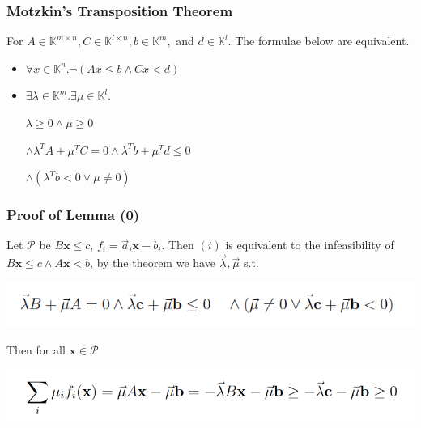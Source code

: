 \documentclass[11pt]{beamer}
\begin{document}
\begin{frame}\frametitle{Motzkin's Transposition Theorem}
\begin{theorem}
For $A\in \mathbb{K}^{m\times n}, C\in \mathbb{K}^{l\times n}, b\in \mathbb{K}^m, $ and $d\in \mathbb{K}^l$. The formulae below are equivalent.
\begin{itemize}
\item $\forall x \in \mathbb{K}^n. \neg (Ax\le b \wedge Cx < d)$

\item $\exists \lambda \in \mathbb{K}^m. \exists \mu \in \mathbb{K}^l.$

$\lambda \ge 0 \wedge \mu \ge 0$

$\wedge \lambda^{T}A + \mu^TC = 0 \wedge \lambda^{T}b + \mu^Td \le 0 $

$\wedge (\lambda^Tb < 0 \vee \mu \ne 0)$

\end{itemize}
\end{theorem}
\end{frame}


\begin{frame}\frametitle{Proof of Lemma (0)}
Let $\mathcal{P}$ be $B\textbf{x} \le c$, $f_i = \vec{a}_i \textbf{x} - b_i$.
Then $(i)$ is equivalent to the infeasibility of $B\textbf{x} \le c \wedge A\textbf{x} < b$, by the theorem we have $\vec{\lambda}, \vec{\mu}$ s.t.

\begin{center}
\includegraphics[scale=0.45]{11.png}
\end{center}
Then for all $\textbf{x}\in \mathcal{P}$
\begin{center}
\includegraphics[scale=0.35]{12.png}
\end{center}
\end{frame}
\end{document}
